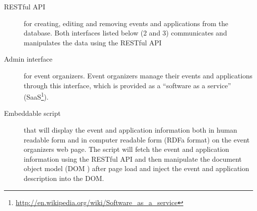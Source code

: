 \begin{description}
\item [RESTful  API] for creating, editing and removing events and applications from the database.
Both interfaces listed below (2 and 3) communicates and manipulates the data using the RESTful API
\item [Admin interface] for event organizers. 
Event organizers manage their events and applications through this interface, which is provided as a ``software as a service'' (SaaS\footnote{\url{http://en.wikipedia.org/wiki/Software_as_a_service}}).
\item [Embeddable script] that will display the event and application information both in human readable form and in computer readable form (RDFa format) on the event organizers web page.
The script will fetch the event and application information using the RESTful API and then manipulate the document object model (DOM ) after page load and inject the event and application description into the DOM.
\end{description}



\begin{figure}[!htbp]
\end{figure}

